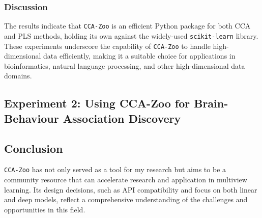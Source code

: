 \subsubsection{Discussion}

The results indicate that \texttt{CCA-Zoo} is an efficient Python package for both CCA and PLS methods, holding its own against the widely-used \texttt{scikit-learn} library.
These experiments underscore the capability of \texttt{CCA-Zoo} to handle high-dimensional data efficiently, making it a suitable choice for applications in bioinformatics, natural language processing, and other high-dimensional data domains.



\subsection{Experiment 2: Using CCA-Zoo for Brain-Behaviour Association Discovery}

\subsection{Conclusion}

\texttt{CCA-Zoo} has not only served as a tool for my research but aims to be a community resource that can accelerate research and application in multiview learning.
Its design decisions, such as API compatibility and focus on both linear and deep models, reflect a comprehensive understanding of the challenges and opportunities in this field.
